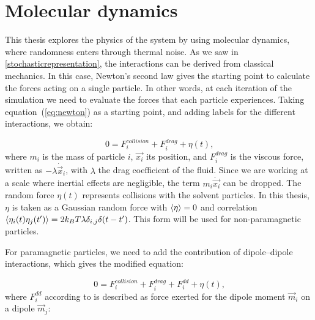 \section{Molecular dynamics}



This thesis explores the physics of the system by using molecular dynamics, where randomness enters through thermal noise. As we saw in \ref{stochasticrepresentation}, the interactions can be derived from classical mechanics. In this case, Newton’s second law gives the starting point to calculate the forces acting on a single particle. In other words, at each iteration of the simulation we need to evaluate the forces that each particle experiences. Taking equation~(\ref{eq:newton}) as a starting point, and adding labels for the different interactions, we obtain:

\begin{equation}
  0 = F^{collision}_i + F^{drag}_i + \eta(t)\text{,}
  \label{eq:langevinratchet}
\end{equation}
where $m_i$ is the mass of particle $i$, $\vec{x_i}$ its position, and $F^{drag}_i$ is the viscous force, written as $-\lambda \dot{\vec{x}}_i$, with $\lambda$ the drag coefficient of the fluid. Since we are working at a scale where inertial effects are negligible, the term $m_i\ddot{\vec{x_i}}$ can be dropped. The random force $\eta(t)$ represents collisions with the solvent particles. In this thesis, $\eta$ is taken as a Gaussian random force with $\expval{\eta} = 0$ and correlation $\expval{\eta_i(t)\eta_j(t')} = 2k_B T \lambda \delta_{i,j}\delta(t-t')$. This form will be used for non-paramagnetic particles.

For paramagnetic particles, we need to add the contribution of dipole–dipole interactions, which gives the modified equation:

\begin{equation}
  0 = F^{collision}_i + F^{drag}_i + F^{dd}_i + \eta(t)\text{,}
  \label{eq:langevindipole}
\end{equation}
where $F^{dd}_i$ according to \cite{yung1998analytic} is described as force exerted for the dipole moment $\vec{m}_i$ on a dipole $\vec{m}_j$:

